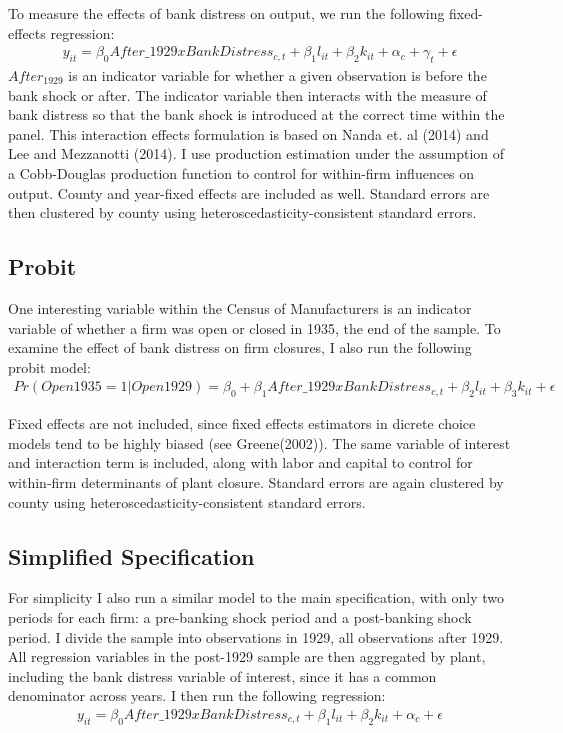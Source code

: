 \documentclass[letter,11pt]{article}
\begin{document}
{To measure the effects of bank distress on output, we run the following fixed-effects regression:
\begin{align*}
y_{it} = \beta_0 After\_1929 x BankDistress_{c,t} + \beta_1 l_{it} + \beta_2 k_{it} + \alpha_c + \gamma_t + \epsilon
\end{align*}
$After_1929$ is an indicator variable for whether a given observation is before the bank shock or after. The indicator variable then interacts with the measure of bank distress so that the bank shock is introduced at the correct time within the panel. This interaction effects formulation is based on Nanda et. al (2014) and Lee and Mezzanotti (2014). I use production estimation under the assumption of a Cobb-Douglas production function to control for within-firm influences on output. County and year-fixed effects are included as well. Standard errors are then clustered by county using heteroscedasticity-consistent standard errors. 

\subsection{Probit}

One interesting variable within the Census of Manufacturers is an indicator variable of whether a firm was open or closed in 1935, the end of the sample. To examine the effect of bank distress on firm closures, I also run the following probit model:
\begin{align*}
Pr(Open 1935 = 1 | Open 1929) = \beta_0 + \beta_1 After\_1929 x BankDistress_{c,t} + \beta_2 l_{it} + \beta_3  k_{it} + \epsilon
\end{align*}

Fixed effects are not included, since fixed effects estimators in dicrete choice models tend to be highly biased (see Greene(2002)). The same variable of interest and interaction term is included, along with labor and capital to control for within-firm determinants of plant closure. Standard errors are again clustered by county using heteroscedasticity-consistent standard errors. 

\subsection{Simplified Specification}

For simplicity I also run a similar model to the main specification, with only two periods for each firm: a pre-banking shock period and a post-banking shock period. I divide the sample into observations in 1929, all observations after 1929. All regression variables in the post-1929 sample are then aggregated by plant, including the bank distress variable of interest, since it has a common denominator across years. I then run the following regression:
\begin{align*}
y_{it} = \beta_0 After\_1929 x BankDistress_{c,t} + \beta_1 l_{it} + \beta_2 k_{it} + \alpha_c  + \epsilon
\end{align*}

}
\end{document}
